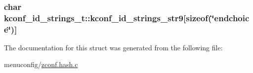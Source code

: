 \hypertarget{structkconf__id__strings__t_a601871c251c4ab09f2daccde3fcbb6e6}{
\subsubsection[{kconf\-\_\-id\-\_\-strings\-\_\-str9}]{\setlength{\rightskip}{0pt plus 5cm}char kconf\-\_\-id\-\_\-strings\-\_\-t\-::kconf\-\_\-id\-\_\-strings\-\_\-str9\mbox{[}sizeof(\char`\"{}endchoice\char`\"{})\mbox{]}}}\label{structkconf__id__strings__t_a601871c251c4ab09f2daccde3fcbb6e6}


The documentation for this struct was generated from the following file\-:\begin{DoxyCompactItemize}
\item 
menuconfig/\hyperlink{zconf_8hash_8c}{zconf.\-hash.\-c}\end{DoxyCompactItemize}
